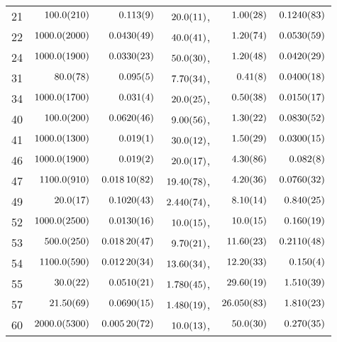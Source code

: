\begin{tabular}{l|r|r|r|r|r}
21 & $\num{100+-21.0}$ & $\num{0.113+-0.009}$ & $\num{20+-1.1}$, & $\num{1.0+-0.28}$ & $\num{0.124+-0.0083}$ \\
22 & $\num{1000+-200.0}$ & $\num{0.043+-0.0049}$ & $\num{40+-4.1}$, & $\num{1.2+-0.74}$ & $\num{0.053+-0.0059}$ \\
24 & $\num{1000+-190.0}$ & $\num{0.033+-0.0023}$ & $\num{50+-3.0}$, & $\num{1.2+-0.48}$ & $\num{0.042+-0.0029}$ \\
31 & $\num{80+-7.8}$ & $\num{0.095+-0.005}$ & $\num{7.7+-0.34}$, & $\num{0.41+-0.08}$ & $\num{0.04+-0.0018}$ \\
34 & $\num{1000+-170.0}$ & $\num{0.031+-0.004}$ & $\num{20+-2.5}$, & $\num{0.5+-0.38}$ & $\num{0.015+-0.0017}$ \\
40 & $\num{100+-20.0}$ & $\num{0.062+-0.0046}$ & $\num{9.0+-0.56}$, & $\num{1.3+-0.22}$ & $\num{0.083+-0.0052}$ \\
41 & $\num{1000+-130.0}$ & $\num{0.019+-0.001}$ & $\num{30+-1.2}$, & $\num{1.5+-0.29}$ & $\num{0.03+-0.0015}$ \\
46 & $\num{1000+-190.0}$ & $\num{0.019+-0.002}$ & $\num{20+-1.7}$, & $\num{4.3+-0.86}$ & $\num{0.082+-0.008}$ \\
47 & $\num{1100+-91.0}$ & $\num{0.0181+-0.00082}$ & $\num{19.4+-0.78}$, & $\num{4.2+-0.36}$ & $\num{0.076+-0.0032}$ \\
49 & $\num{20+-1.7}$ & $\num{0.102+-0.0043}$ & $\num{2.44+-0.074}$, & $\num{8.1+-0.14}$ & $\num{0.84+-0.025}$ \\
52 & $\num{1000+-250.0}$ & $\num{0.013+-0.0016}$ & $\num{10+-1.5}$, & $\num{10+-1.5}$ & $\num{0.16+-0.019}$ \\
53 & $\num{500+-25.0}$ & $\num{0.0182+-0.00047}$ & $\num{9.7+-0.21}$, & $\num{11.6+-0.23}$ & $\num{0.211+-0.0048}$ \\
54 & $\num{1100+-59.0}$ & $\num{0.0122+-0.00034}$ & $\num{13.6+-0.34}$, & $\num{12.2+-0.33}$ & $\num{0.15+-0.004}$ \\
55 & $\num{30+-2.2}$ & $\num{0.051+-0.0021}$ & $\num{1.78+-0.045}$, & $\num{29.6+-0.19}$ & $\num{1.51+-0.039}$ \\
57 & $\num{21.5+-0.69}$ & $\num{0.069+-0.0015}$ & $\num{1.48+-0.019}$, & $\num{26.05+-0.083}$ & $\num{1.81+-0.023}$ \\
60 & $\num{2000+-530.0}$ & $\num{0.0052+-0.00072}$ & $\num{10+-1.3}$, & $\num{50+-3.0}$ & $\num{0.27+-0.035}$ \\
\end{tabular}
